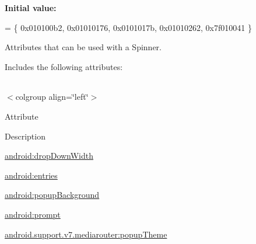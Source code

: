 {\bfseries Initial value\+:}
\begin{DoxyCode}
= \{
            0x010100b2, 0x01010176, 0x0101017b, 0x01010262,
            0x7f010041
        \}
\end{DoxyCode}
Attributes that can be used with a Spinner. 

Includes the following attributes\+:

\tabulinesep=1mm
\begin{longtabu} spread 0pt [c]{*{0}{|X[-1]}|}
\hline
\end{longtabu}
$<$colgroup align=\char`\"{}left\char`\"{}$>$ 

Attribute

Description 

{\ttfamily \hyperlink{classandroid_1_1support_1_1v7_1_1mediarouter_1_1R_1_1styleable_ada50bd28e8330a67162fad2ff9914162}{android\+:drop\+Down\+Width}}

{\ttfamily \hyperlink{classandroid_1_1support_1_1v7_1_1mediarouter_1_1R_1_1styleable_a5d540e7f1f03b94e5f052572d1221d5d}{android\+:entries}}

{\ttfamily \hyperlink{classandroid_1_1support_1_1v7_1_1mediarouter_1_1R_1_1styleable_aea757797202520a71cc660bcc5f29e00}{android\+:popup\+Background}}

{\ttfamily \hyperlink{classandroid_1_1support_1_1v7_1_1mediarouter_1_1R_1_1styleable_aefc5f8f841d0a3444bacf4b203f30ade}{android\+:prompt}}

{\ttfamily \hyperlink{classandroid_1_1support_1_1v7_1_1mediarouter_1_1R_1_1styleable_a9e887ce78259fc5079eb2c603b3ac56f}{android.\+support.\+v7.\+mediarouter\+:popup\+Theme}}

